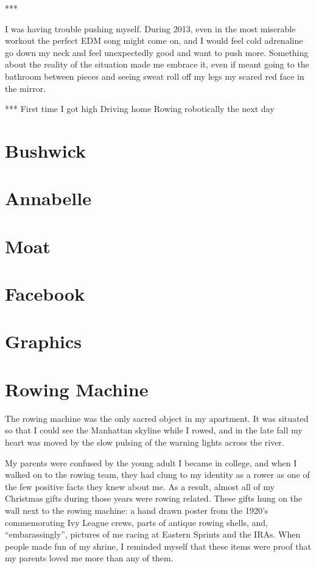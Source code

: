 \documentclass[12pt]{article}
\begin{document}
***

I was having trouble pushing myself.  During 2013, even in the most miserable
workout the perfect EDM song might come on, and I would feel cold adrenaline go
down my neck and feel unexpectedly good and want to push more.  Something about
the reality of the situation made me embrace it, even if meant going to the
bathroom between pieces and seeing sweat roll off my legs my scared red face in
the mirror.  

***
First time I got high
Driving home
Rowing robotically the next day

\section{Bushwick}


\section{Annabelle}


\section{Moat}


\section{Facebook}


\section{Graphics}


\section{Rowing Machine}
The rowing machine was the only sacred object in my apartment.  It was situated
so that I could see the Manhattan skyline while I rowed, and in the late fall
my heart was moved by the slow pulsing of the warning lights across the river.

My parents were confused by the young adult I became in college, and when I
walked on to the rowing team, they had clung to my identity as a rower as one of
the few positive facts they knew about me.  As a result, almost all of my
Christmas gifts during those years were rowing related.  These gifts hung on the
wall next to the rowing machine: a hand drawn poster from the 1920's
commemorating Ivy League crews, parts of antique rowing shells, and,
``embarassingly'', pictures of me racing at Eastern Sprints and the IRAs.  When
people made fun of my shrine, I reminded myself that these items were proof that
my parents loved me more than any of them.
\end{document}

